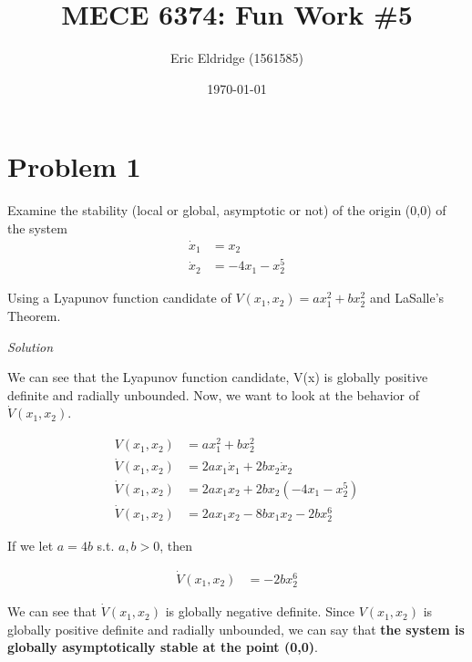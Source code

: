 \documentclass{article}
\title{MECE 6374: Fun Work \#5}
\date{\today}
\author{Eric Eldridge (1561585)}
\begin{document}

  \maketitle

  \section{Problem 1}

  Examine the stability (local or global, asymptotic or not) of the origin (0,0)
  of the system
  \begin{align*}
    \dot{x}_1 &= x_2 \\
    \dot{x}_2 &= -4x_1 -x_2^5
  \end{align*}

  \noindent Using a Lyapunov function candidate of $V(x_1,x_2)=ax_1^2+bx_2^2$
  and LaSalle's Theorem. \newline \newline

  \noindent \textit{Solution} \newline \newline

  We can see that the Lyapunov function candidate, V(x) is globally positive
  definite and radially unbounded. Now, we want to look at the behavior of $\dot{V}(x_1,x_2)$.

  \begin{align*}
    V(x_1,x_2) &= ax_1^2 + bx_2^2 \\
    \dot{V}(x_1,x_2) &= 2ax_1\dot{x}_1 + 2bx_2\dot{x}_2 \\
    \dot{V}(x_1,x_2) &= 2ax_1x_2 + 2bx_2(-4x_1 -x_2^5) \\
    \dot{V}(x_1,x_2) &= 2ax_1x_2 - 8bx_1x_2 -2bx_2^6 
  \end{align*}

  If we let $a = 4b$ s.t. $a,b >0$, then

  \begin{align*}
    \dot{V}(x_1,x_2) &= -2bx_2^6
  \end{align*}

  We can see that $\dot{V}(x_1,x_2)$ is globally negative definite. Since
  $V(x_1,x_2)$ is globally positive definite and radially unbounded, we can say
  that \textbf{the system is globally asymptotically stable at the point (0,0)}.
\end{document}
